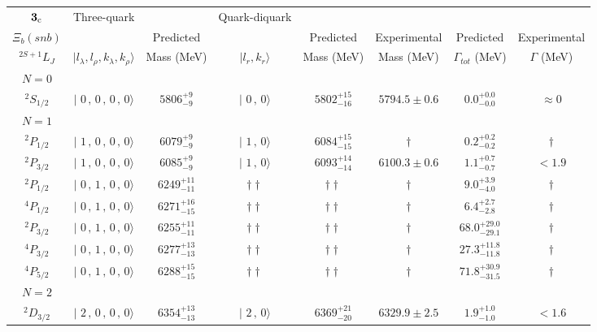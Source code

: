 \begin{tabular}{c| c c c c c c c}\hline \hline
${\bf {3}}_{\rm c}$  & Three-quark & & Quark-diquark   &             &      &        &  \\ 
$\Xi_{b}(snb)$ &   & Predicted  &   &  Predicted   &  Experimental &  Predicted            & Experimental \\ 
 $^{2S+1}L_{J}$ & $\vert l_{\lambda}, l_{\rho}, k_{\lambda}, k_{\rho} \rangle$ & Mass (MeV)  & $\vert l_{r}, k_{r} \rangle$  &  Mass (MeV)   &  Mass (MeV)   &  $\Gamma_{tot}$ (MeV) & $\Gamma$ (MeV) \\ \hline
\hline
 $N=0$  &  &  &  &  &  \\ 
$^{2}S_{1/2}$ & $\vert \,\,0\,,\,0\,,\,0\,,\,0 \rangle $ & $5806^{+9}_{-9}$ & $\vert \,\,0\,,\,0 \rangle$ & $5802^{+15}_{-16}$ & $5794.5\pm 0.6$ & $0.0^{+0.0}_{-0.0}$ & $\approx 0$ \\ 
\hline
 $N=1$  &  &  &  &  &  \\ 
$^{2}P_{1/2}$ & $\vert \,\,1\,,\,0\,,\,0\,,\,0 \rangle $ & $6079^{+9}_{-9}$ & $\vert \,\,1\,,\,0 \rangle$ & $6084^{+15}_{-15}$ & $\dagger$ & $0.2^{+0.2}_{-0.2}$ & $\dagger$ \\ 
$^{2}P_{3/2}$ & $\vert \,\,1\,,\,0\,,\,0\,,\,0 \rangle $ & $6085^{+9}_{-9}$ & $\vert \,\,1\,,\,0 \rangle$ & $6093^{+14}_{-14}$ & $6100.3\pm 0.6$ & $1.1^{+0.7}_{-0.7}$ & $<1.9$ \\ 
$^{2}P_{1/2}$ & $\vert \,\,0\,,\,1\,,\,0\,,\,0 \rangle $ & $6249^{+11}_{-11}$ & $\dagger\dagger$ & $\dagger\dagger$ & $\dagger$ & $9.0^{+3.9}_{-4.0}$ & $\dagger$ \\ 
$^{4}P_{1/2}$ & $\vert \,\,0\,,\,1\,,\,0\,,\,0 \rangle $ & $6271^{+16}_{-15}$ & $\dagger\dagger$ & $\dagger\dagger$ & $\dagger$ & $6.4^{+2.7}_{-2.8}$ & $\dagger$ \\ 
$^{2}P_{3/2}$ & $\vert \,\,0\,,\,1\,,\,0\,,\,0 \rangle $ & $6255^{+11}_{-11}$ & $\dagger\dagger$ & $\dagger\dagger$ & $\dagger$ & $68.0^{+29.0}_{-29.1}$ & $\dagger$ \\ 
$^{4}P_{3/2}$ & $\vert \,\,0\,,\,1\,,\,0\,,\,0 \rangle $ & $6277^{+13}_{-13}$ & $\dagger\dagger$ & $\dagger\dagger$ & $\dagger$ & $27.3^{+11.8}_{-11.8}$ & $\dagger$ \\ 
$^{4}P_{5/2}$ & $\vert \,\,0\,,\,1\,,\,0\,,\,0 \rangle $ & $6288^{+15}_{-15}$ & $\dagger\dagger$ & $\dagger\dagger$ & $\dagger$ & $71.8^{+30.9}_{-31.5}$ & $\dagger$ \\ 
\hline
 $N=2$  &  &  &  &  &  \\ 
$^{2}D_{3/2}$ & $\vert \,\,2\,,\,0\,,\,0\,,\,0 \rangle $ & $6354^{+13}_{-13}$ & $\vert \,\,2\,,\,0 \rangle$ & $6369^{+21}_{-20}$ & $6329.9\pm 2.5$ & $1.9^{+1.0}_{-1.0}$ & $<1.6$ \\ 

\end{tabular}
